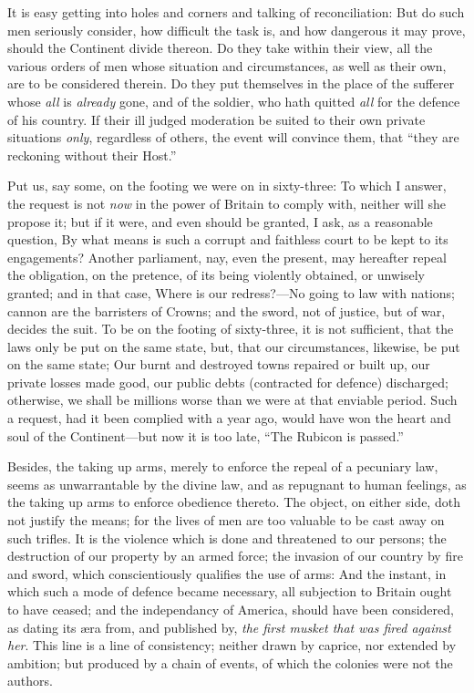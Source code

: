 \documentclass[12pt, twocolumn]{book}
\begin{document}
    It is easy getting into holes and corners and talking of reconciliation: But do such men seriously consider, how difficult the task is, and how dangerous it may prove, should the Continent divide thereon. Do they take within their view, all the various orders of men whose situation and circumstances, as well as their own, are to be considered therein. Do they put themselves in the place of the sufferer whose \textit{all} is \textit{already} gone, and of the soldier, who hath quitted \textit{all} for the defence of his country. If their ill judged moderation be suited to their own private situations \textit{only}, regardless of others, the event will convince them, that “they are reckoning without their Host.”

    Put us, say some, on the footing we were on in sixty-three: To which I answer, the request is not \textit{now} in the power of Britain to comply with, neither will she propose it; but if it were, and even should be granted, I ask, as a reasonable question, By what means is such a corrupt and faithless court to be kept to its engagements? Another parliament, nay, even the present, may hereafter repeal the obligation, on the pretence, of its being violently obtained, or unwisely granted; and in that case, Where is our redress?—No going to law with nations; cannon are the barristers of Crowns; and the sword, not of justice, but of war, decides the suit. To be on the footing of sixty-three, it is not sufficient, that the laws only be put on the same state, but, that our circumstances, likewise, be put on the same state; Our burnt and destroyed towns repaired or built up, our private losses made good, our public debts (contracted for defence) discharged; otherwise, we shall be millions worse than we were at that enviable period. Such a request, had it been complied with a year ago, would have won the heart and soul of the Continent—but now it is too late, “The Rubicon is passed.”

    Besides, the taking up arms, merely to enforce the repeal of a pecuniary law, seems as unwarrantable by the divine law, and as repugnant to human feelings, as the taking up arms to enforce obedience thereto. The object, on either side, doth not justify the means; for the lives of men are too valuable to be cast away on such trifles. It is the violence which is done and threatened to our persons; the destruction of our property by an armed force; the invasion of our country by fire and sword, which conscientiously qualifies the use of arms: And the instant, in which such a mode of defence became necessary, all subjection to Britain ought to have ceased; and the independancy of America, should have been considered, as dating its æra from, and published by, \textit{the first musket that was fired against her}. This line is a line of consistency; neither drawn by caprice, nor extended by ambition; but produced by a chain of events, of which the colonies were not the authors.
\end{document}
